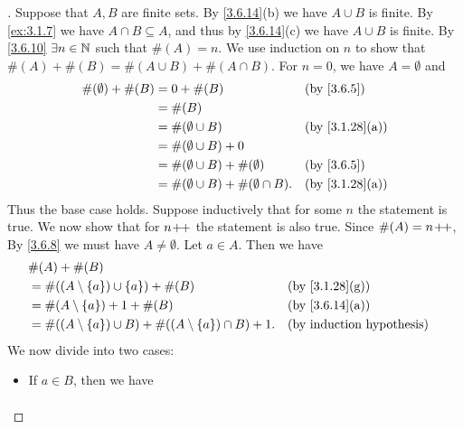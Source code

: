 \begin{proof}[]
	Suppose that \(A, B\) are finite sets.
	By \cref{3.6.14}(b) we have \(A \cup B\) is finite.
	By \cref{ex:3.1.7} we have \(A \cap B \subseteq A\), and thus by \cref{3.6.14}(c) we have \(A \cup B\) is finite.
	By \cref{3.6.10} \(\exists n \in \mathbb{N}\) such that \(\#(A) = n\).
	We use induction on \(n\) to show that \(\#(A) + \#(B) = \#(A \cup B) + \#(A \cap B)\).
	For \(n = 0\), we have \(A = \emptyset\) and
	\begin{align*}
		\#(\emptyset) + \#(B) & = 0 + \#(B)                                    &  & \by{3.6.5}                   \\
		                      & = \#(B)                                                                          \\
		                      & = \#(\emptyset \cup B)                         &  & \text{(by \cref{3.1.28}(a))} \\
		                      & = \#(\emptyset \cup B) + 0                                                       \\
		                      & = \#(\emptyset \cup B) + \#(\emptyset)         &  & \by{3.6.5}                   \\
		                      & = \#(\emptyset \cup B) + \#(\emptyset \cap B). &  & \text{(by \cref{3.1.28}(a))}
	\end{align*}
	Thus the base case holds.
	Suppose inductively that for some \(n\) the statement is true.
	We now show that for \(n\!+\!\!+\) the statement is also true.
	Since \(\#(A) = n\!+\!\!+\), By \cref{3.6.8} we must have \(A \neq \emptyset\).
	Let \(a \in A\).
	Then we have
	\begin{align*}
		 & \#(A) + \#(B)                                                                                                \\
		 & = \#((A \setminus \set{a}) \cup \set{a}) + \#(B)                           &  & \text{(by \cref{3.1.28}(g))} \\
		 & = \#(A \setminus \set{a}) + 1 + \#(B)                                      &  & \text{(by \cref{3.6.14}(a))} \\
		 & = \#((A \setminus \set{a}) \cup B) + \#((A \setminus \set{a}) \cap B) + 1. &  & \byIH
	\end{align*}
	We now divide into two cases:
	\begin{itemize}
		\item If \(a \in B\), then we have
		      \begin{align*}

\end{align*}
\end{itemize}
\end{proof}
